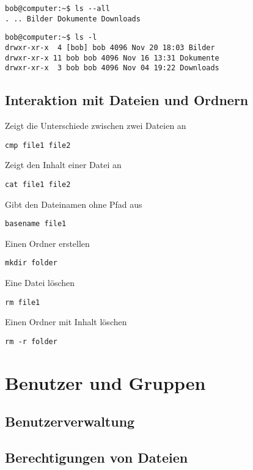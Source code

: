 \documentclass[11pt]{article}
\begin{document}
\begin{lstlisting}[style=terminal]
bob@computer:~$ ls --all
. .. Bilder Dokumente Downloads
\end{lstlisting}

\begin{lstlisting}[style=terminal]
bob@computer:~$ ls -l
drwxr-xr-x  4 [bob] bob 4096 Nov 20 18:03 Bilder
drwxr-xr-x 11 bob bob 4096 Nov 16 13:31 Dokumente
drwxr-xr-x  3 bob bob 4096 Nov 04 19:22 Downloads
\end{lstlisting}

\subsection {Interaktion mit Dateien und Ordnern}

Zeigt die Unterschiede zwischen zwei Dateien an
\begin{lstlisting}
cmp file1 file2
\end{lstlisting}

Zeigt den Inhalt einer Datei an
\begin{lstlisting}
cat file1 file2
\end{lstlisting}

Gibt den Dateinamen ohne Pfad aus
\begin{lstlisting}
basename file1
\end{lstlisting}

Einen Ordner erstellen
\begin{lstlisting}
mkdir folder
\end{lstlisting}

\begin{multicols}{2}
Eine Datei löschen
\begin{lstlisting}
rm file1
\end{lstlisting}
\columnbreak
Einen Ordner mit Inhalt löschen
\begin{lstlisting}
rm -r folder
\end{lstlisting}
\end{multicols}

\section {Benutzer und Gruppen}

\subsection {Benutzerverwaltung}

\subsection {Berechtigungen von Dateien}




\end{document}
